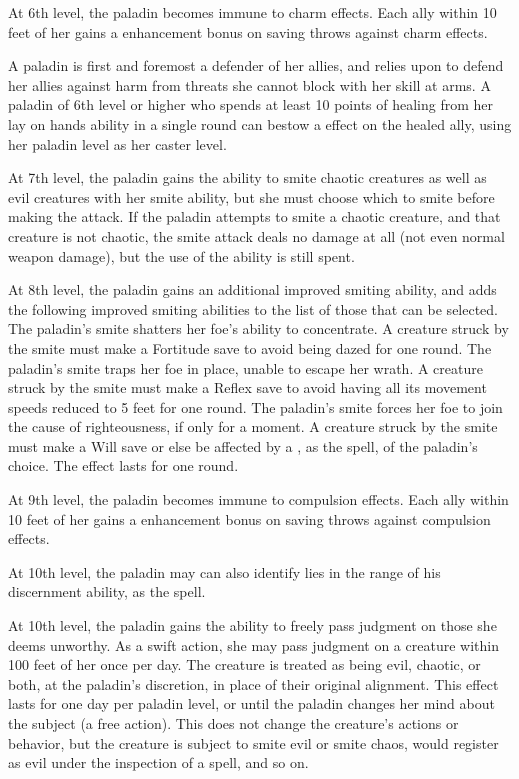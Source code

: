  At 6th level, the paladin becomes immune to charm effects. Each ally within 10 feet of her gains a  enhancement bonus on saving throws against charm effects.

 A paladin is first and foremost a defender of her allies, and relies upon  to defend her allies against harm from threats she cannot block with her skill at arms. A paladin of 6th level or higher who spends at least 10 points of healing from her lay on hands ability in a single round can bestow a  effect on the healed ally, using her paladin level as her caster level.

 At 7th level, the paladin gains the ability to smite chaotic creatures as well as evil creatures with her smite ability, but she must choose which to smite before making the attack. If the paladin attempts to smite a chaotic creature, and that creature is not chaotic, the smite attack deals no damage at all (not even normal weapon damage), but the use of the ability is still spent.

 At 8th level, the paladin gains an additional improved smiting ability, and adds the following improved smiting abilities to the list of those that can be selected.
 The paladin's smite shatters her foe's ability to concentrate. A creature struck by the smite must make a Fortitude save to avoid being dazed for one round.
 The paladin's smite traps her foe in place, unable to escape her wrath. A creature struck by the smite must make a Reflex save to avoid having all its movement speeds reduced to 5 feet for one round.
 The paladin's smite forces her foe to join the cause of righteousness, if only for a moment. A creature struck by the smite must make a Will save or else be affected by a , as the spell, of the paladin's choice. The effect lasts for one round.

 At 9th level, the paladin becomes immune to compulsion effects. Each ally within 10 feet of her gains a  enhancement bonus on saving throws against compulsion effects.

 At 10th level, the paladin may can also identify lies in the range of his discernment ability, as the  spell.

 At 10th level, the paladin gains the ability to freely pass judgment on those she deems unworthy. As a swift action, she may pass judgment on a creature within 100 feet of her once per day. The creature is treated as being evil, chaotic, or both, at the paladin's discretion, in place of their original alignment. This effect lasts for one day per paladin level, or until the paladin changes her mind about the subject (a free action). This does not change the creature's actions or behavior, but the creature is subject to smite evil or smite chaos, would register as evil under the inspection of a  spell, and so on.

